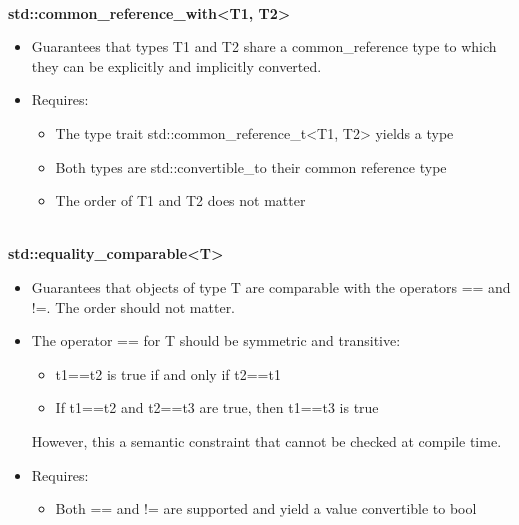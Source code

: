 \noindent
\hspace*{\fill} \\ %
\textbf{std::common\_reference\_with<T1, T2>}

\begin{itemize}
\item
Guarantees that types T1 and T2 share a common\_reference type to which they can be explicitly and implicitly converted.

\item
Requires:
\begin{itemize}
\item
The type trait std::common\_reference\_t<T1, T2> yields a type

\item
Both types are std::convertible\_to their common reference type

\item
The order of T1 and T2 does not matter
\end{itemize}
\end{itemize}


\noindent
\hspace*{\fill} \\ %
\textbf{std::equality\_comparable<T>}

\begin{itemize}
\item
Guarantees that objects of type T are comparable with the operators == and !=. The order should not matter.

\item
The operator == for T should be symmetric and transitive:
\begin{itemize}
\item
t1==t2 is true if and only if t2==t1

\item
If t1==t2 and t2==t3 are true, then t1==t3 is true
\end{itemize}

However, this a semantic constraint that cannot be checked at compile time.

\item
Requires:
\begin{itemize}
\item
Both == and != are supported and yield a value convertible to bool
\end{itemize}
\end{itemize}


